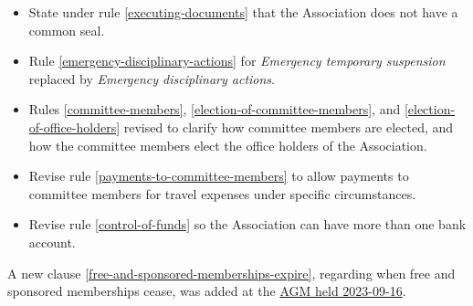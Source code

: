 \documentclass[../constitution.tex]{subfiles}
\begin{document}
\begin{itemize}
    \item State under rule \ref{executing-documents} that the Association does not have a common seal.
    \item Rule \ref{emergency-disciplinary-actions} for \textit{Emergency temporary suspension} replaced by \textit{Emergency disciplinary actions}.
    \item Rules \ref{committee-members}, \ref{election-of-committee-members}, and \ref{election-of-office-holders} revised to clarify how committee members are elected, and how the committee members elect the office holders of the Association.
    \item Revise rule \ref{payments-to-committee-members} to allow payments to committee members for travel expenses under specific circumstances.
    \item Revise rule \ref{control-of-funds} so the Association can have more than one bank account.

\end{itemize}

A new clause \ref{free-and-sponsored-memberships-expire}, regarding when free and sponsored memberships cease, was added at the \href{https://wiki.artifactory.org.au/en/minutes/AGM/2023-09-16}{AGM held 2023-09-16}.
\end{document}
